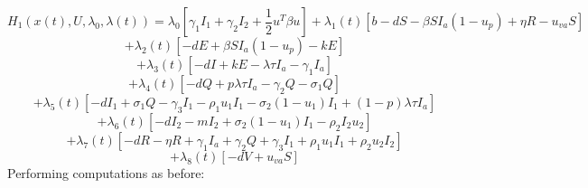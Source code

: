 \documentclass[a4paper]{article}
\begin{document}
\begin{equation*}
H_1\left(x\left(t\right),U,\lambda _0,\lambda \left(t\right)\right)=\lambda _0\left[\gamma _1I_1+\gamma _2I_2+\frac 1
2u^T\mathit{\beta u}\right]+\lambda _1\left(t\right)\left[b-\mathit{dS}-\mathit{\beta
S}I_a\left(1-u_p\right)+\mathit{\eta R}-u_{\mathit{va}}S\right]
\end{equation*}
\begin{equation*}
+\lambda _2\left(t\right)\left[-\mathit{dE}+\mathit{\beta S}I_a\left(1-u_p\right)-\mathit{kE}\right]
\end{equation*}
\begin{equation*}
+\lambda _3\left(t\right)\left[-\mathit{dI}+\mathit{kE}-\mathit{\lambda \tau }I_a-\gamma _1I_a\right]
\end{equation*}
\begin{equation*}
+\lambda _4\left(t\right)\left[-\mathit{dQ}+\mathit{p\lambda \tau }I_a-\gamma _2Q-\sigma _1Q\right]
\end{equation*}
\begin{equation*}
+\lambda _5\left(t\right)\left[-dI_1+\sigma _1Q-\gamma _3I_1-\rho _1u_1I_1-\sigma
_2\left(1-u_1\right)I_1+\left(1-p\right)\mathit{\lambda \tau }I_a\right]
\end{equation*}
\begin{equation*}
+\lambda _6\left(t\right)\left[-dI_2-mI_2+\sigma _2\left(1-u_1\right)I_1-\rho _2I_2u_2\right]
\end{equation*}
\begin{equation*}
+\lambda _7\left(t\right)\left[-\mathit{dR}-\mathit{\eta R}+\gamma _1I_a+\gamma _2Q+\gamma _3I_1+\rho _1u_1I_1+\rho
_2u_2I_2\right]
\end{equation*}
\begin{equation*}
+\lambda _8\left(t\right)\left[-\mathit{dV}+u_{\mathit{va}}S\right]
\end{equation*}
Performing computations as before:
\end{document}
